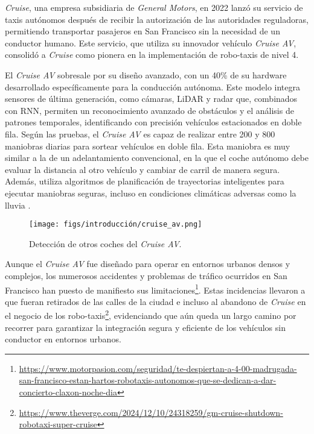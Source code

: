 \textit{Cruise}, una empresa subsidiaria de \textit{General Motors}, en 2022 lanzó su servicio de taxis autónomos después de recibir la autorización de las autoridades reguladoras, permitiendo transportar pasajeros en San Francisco sin la necesidad de un conductor humano. Este servicio, que utiliza su innovador vehículo \textit{Cruise AV}, consolidó a \textit{Cruise} como pionera en la implementación de robo-taxis de nivel 4. 

El \textit{Cruise AV} sobresale por su diseño avanzado, con un 40\% de su hardware desarrollado específicamente para la conducción autónoma. Este modelo integra sensores de última generación, como cámaras, \ac{LiDAR} y radar que, combinados con \ac{RNN}, permiten un reconocimiento avanzado de obstáculos y el análisis de patrones temporales, identificando con precisión vehículos estacionados en doble fila. Según las pruebas, el \textit{Cruise AV} es capaz de realizar entre 200 y 800 maniobras diarias para sortear vehículos en doble fila. Esta maniobra es muy similar a la de un adelantamiento convencional, en la que el coche autónomo debe evaluar la distancia al otro vehículo y cambiar de carril de manera segura. Además, utiliza algoritmos de planificación de trayectorias inteligentes para ejecutar maniobras seguras, incluso en condiciones climáticas adversas como la lluvia \cite{cruise}.

\begin{figure}[ht]
\begin{center}
\texttt{[image: figs/introducción/cruise\_av.png]}
\end{center}
\caption{Detección de otros coches del \textit{Cruise AV}.}
\label{fig:cruise}
\end{figure}

\newpage

Aunque el \textit{Cruise AV} fue diseñado para operar en entornos urbanos densos y complejos, los numerosos accidentes y problemas de tráfico ocurridos en San Francisco han puesto de manifiesto sus limitaciones\footnote{\url{https://www.motorpasion.com/seguridad/te-despiertan-a-4-00-madrugada-san-francisco-estan-hartos-robotaxis-autonomos-que-se-dedican-a-dar-concierto-claxon-noche-dia}}. Estas incidencias llevaron a que fueran retirados de las calles de la ciudad e incluso al abandono de \textit{Cruise} en el negocio de los robo-taxis\footnote{\url{https://www.theverge.com/2024/12/10/24318259/gm-cruise-shutdown-robotaxi-super-cruise}}, evidenciando que aún queda un largo camino por recorrer para garantizar la integración segura y eficiente de los vehículos sin conductor en entornos urbanos.

